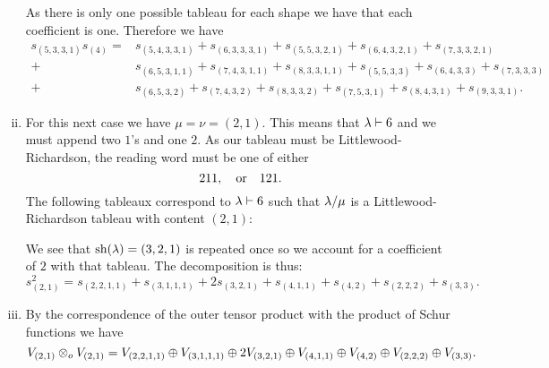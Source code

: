 \documentclass[12pt]{memoir}
\begin{document}
\begin{ptcbr}
\begin{enumerate}[i)]
\begin{itemize}
        \end{itemize}
        As there is only one possible tableau for each shape we have that each coefficient is one. Therefore we have 
        \begin{align*}
            s_{(5,3,3,1)}s_{(4)}=&s_{(5,4,3,3,1)}+s_{(6,3,3,3,1)}+s_{(5,5,3,2,1)}+s_{(6,4,3,2,1)}+s_{(7,3,3,2,1)}\\
            +&s_{(6,5,3,1,1)}+s_{(7,4,3,1,1)}+s_{(8,3,3,1,1)}+s_{(5,5,3,3)}+s_{(6,4,3,3)}+s_{(7,3,3,3)}\\
            +&s_{(6,5,3,2)}+s_{(7,4,3,2)}+s_{(8,3,3,2)}+s_{(7,5,3,1)}+s_{(8,4,3,1)}+s_{(9,3,3,1)}.    
        \end{align*}
        \item For this next case we have $\mu = \nu =(2,1)$. This means that $\lambda\vdash 6$ and we must append two $1$'s and one $2$. As our tableau must be Littlewood-Richardson, the reading word must be one of either 
        $$211,\quad\text{or}\quad121.$$
        The following tableaux correspond to $\lambda\vdash 6$ such that $\lambda/\mu$ is a Littlewood-Richardson tableau with content $(2,1)$:
        \begin{itemize}
        \end{itemize}
        We see that $\text{sh}(\lambda)=(3,2,1)$ is repeated once so we account for a coefficient of $2$ with that tableau. The decomposition is thus:
        $$s_{(2,1)}^2=s_{(2,2,1,1)}+s_{(3,1,1,1)}+2s_{(3,2,1)}+s_{(4,1,1)}+s_{(4,2)}+s_{(2,2,2)}+s_{(3,3)}.$$
        \item By the correspondence of the outer tensor product with the product of Schur functions we have 
        $$V_{(2,1)}\otimes_o V_{(2,1)}=V_{(2,2,1,1)}\oplus V_{(3,1,1,1)}\oplus2V_{(3,2,1)}\oplus V_{(4,1,1)}\oplus V_{(4,2)}\oplus V_{(2,2,2)}\oplus V_{(3,3)}.$$
        
\end{enumerate}    
\end{ptcbr}
\end{document}
